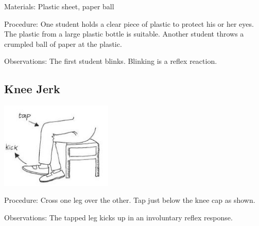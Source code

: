 \begin{multicols}{2}
\begin{description*}
\item[Materials:]{Plastic sheet, paper ball}
\item[Procedure:]{One student holds a clear piece of
plastic to protect his or her eyes.
The plastic from a large plastic
bottle is suitable. Another student
throws a crumpled ball of paper
at the plastic. }
\item[Observations:]{The first student
blinks. Blinking is a reflex
reaction.}
\end{description*}

\subsection{Knee Jerk}

\begin{center}
\includegraphics[width=0.4\textwidth]{./img/vso/knee-jerk.jpg}
\end{center}

\begin{description*}
\item[Procedure:]{Cross one leg over the other. Tap
just below the knee cap as shown.
}
\item[Observations:]{The tapped leg kicks up in an
involuntary reflex response.}
\end{description*}


\end{multicols}
